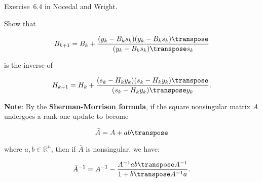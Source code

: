 \begin{problem}\label{prob:02}%
  Exercise~6.4 in Nocedal and Wright.
  
  Show that
  
  \[ B_{k+1} = B_{k} + \frac{(y_k-B_{k}s_{k})(y_k-B_{k}s_{k})\transpose}{(y_k-B_{k}s_{k})\transpose s_k} \]
  
  is the inverse of 
   
  \[ H_{k+1} = H_k + \frac{(s_k-H_{k}y_{k})(s_k-H_{k}y_{k})\transpose}{(s_k-H_{k}y_{k})\transpose y_k} \text{.}\]
  
  \textbf{Note}: \textnormal{By the \textbf{Sherman-Morrison formula}, if the square nonsingular matrix $A$ undergoes a rank-one update to become}
  
  \[\bar{A} = A + ab\transpose\]
  
  \textnormal{where $a,b\in \mathbb{R}^n$, then if $\bar{A}$ is nonsingular, we have:}
  
  \[\bar{A}^{-1} = A^{-1} - \frac{A^{-1}ab\transpose A^{-1}}{1+b\transpose A^{-1}a} \text{.} \]
\end{problem}


